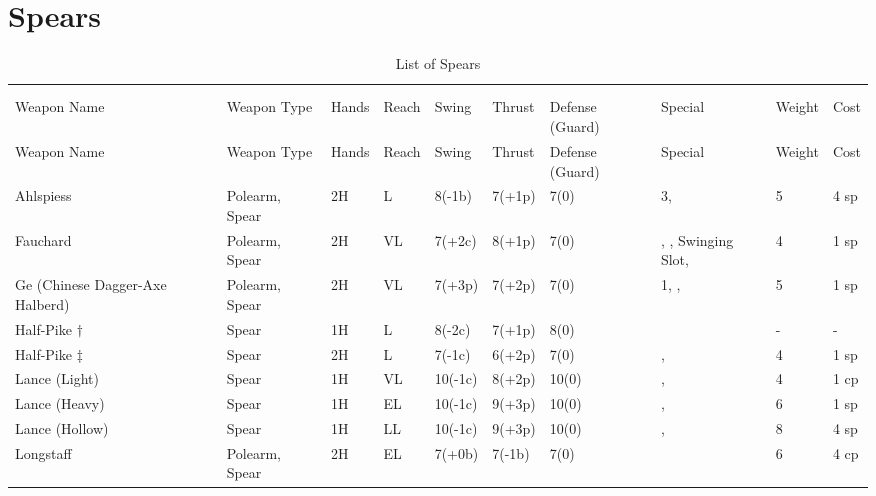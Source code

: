 \documentclass[oneside,11pt,english]{book}
\begin{document}
\section{Spears}\vspace{-15pt}
\begin{longtabu} to 1\linewidth {X[2,l] X X[-1,c] X[-1,c] XX X[-1,c] X[2,l] X[-3,c] X[-3,r]}
  \captionsetup{labelformat=blank,textformat=empty}
  \caption{List of Spears}\vspace{-15pt}\\
  \label{tab:Spears}\\
  Weapon Name						&Weapon Type			&Hands	&Reach	&Swing		&Thrust	&Defense (Guard)	&Special																	&Weight	&Cost\\\toprule\endfirsthead
  Weapon Name						&Weapon Type			&Hands	&Reach	&Swing		&Thrust	&Defense (Guard)	&Special																	&Weight	&Cost\\\toprule\endhead
  Ahlspiess 						&Polearm, Spear			&2H		&L		&8(-1b)		&7(+1p) &7(0)				& 3, 													&5		&4 sp\\
  Fauchard 						&Polearm, Spear			&2H		&VL 	&7(+2c)		&8(+1p) &7(0)				&, , Swinging Slot,								&4		&1 sp\\
  Ge (Chinese Dagger-Axe Halberd)	&Polearm, Spear			&2H		&VL 	&7(+3p)		&7(+2p) &7(0)				& 1, , 											&5		&1 sp\\
  Half-Pike {$ \dagger $}						&Spear					&1H		&L		&8(-2c)		&7(+1p) &8(0)				&																&-		&-\\
  Half-Pike {$ \ddagger $} 						&Spear 					&2H		&L		&7(-1c)		&6(+2p) &7(0)				&,  													&4		&1 sp\\
  Lance (Light) 					&Spear 					&1H		&VL		&10(-1c)	&8(+2p) &10(0)				&,  												&4		&1 cp\\
  Lance (Heavy) 					&Spear 					&1H		&EL		&10(-1c)	&9(+3p) &10(0)				&,  												&6		&1 sp\\
  Lance (Hollow) 					&Spear 					&1H		&LL		&10(-1c)	&9(+3p) &10(0)				&,  												&8		&4 sp\\
  Longstaff 						&Polearm, Spear			&2H		&EL		&7(+0b)		&7(-1b) &7(0)				&																&6		&4 cp\\

\end{longtabu}
\end{document}
